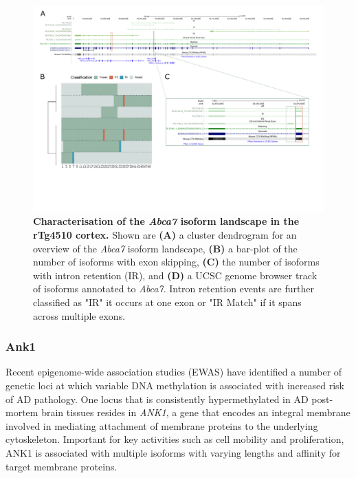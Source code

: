 \begin{landscape}
	\begin{figure}[htp]
		\centering
		\captionsetup{width=1.3\textwidth}
		\includegraphics[page=2,trim={0 1.5cm 0 0},scale = 0.85]{Figures/TargetGenes_Annotation_Landscape.pdf}
		\caption[Characterisation of the \textit{Abca7} isoform landscape]%
		{\textbf{Characterisation of the \textit{Abca7} isoform landscape in the rTg4510 cortex.} Shown are \textbf{(A)} a cluster dendrogram for an overview of the \textit{Abca7} isoform landscape, \textbf{(B)} a bar-plot of the number of isoforms with exon skipping, \textbf{(C)} the number of isoforms with intron retention (IR), and \textbf{(D)} a UCSC genome browser track of isoforms annotated to \textit{Abca7}. Intron retention events are further classified as "IR" it occurs at one exon or "IR Match" if it spans across multiple exons. }    
		\label{fig:abca7}
	\end{figure}
\end{landscape}
\restoregeometry

\subsubsection{Ank1} 
\label{ch6: ank1}
Recent epigenome-wide association studies (EWAS) have identified a number of genetic loci at which variable DNA methylation is associated with increased risk of AD pathology\cite{Smith2019, Lunnon2014}. One locus that is consistently hypermethylated in AD post-mortem brain tissues resides in \textit{ANK1}, a gene that encodes an integral membrane involved in mediating attachment of membrane proteins to the underlying cytoskeleton\cite{Smith2019, Lunnon2014}. Important for key activities such as cell mobility and proliferation, ANK1 is associated with multiple isoforms with varying lengths and affinity for target membrane proteins.

